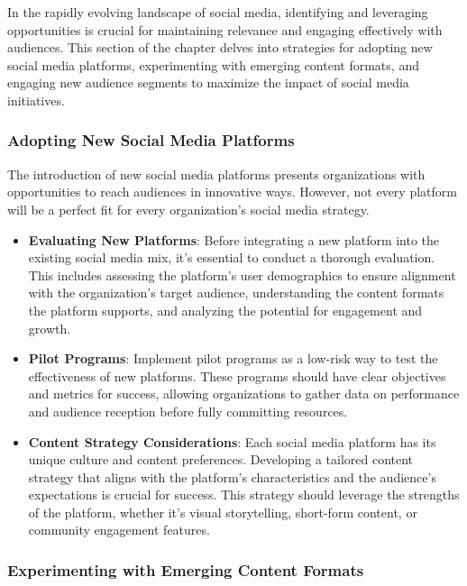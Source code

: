 \documentclass[
]{book}
\providecommand{\tightlist}{%
  \setlength{\itemsep}{0pt}\setlength{\parskip}{0pt}}
\begin{document}
In the rapidly evolving landscape of social media, identifying and leveraging opportunities is crucial for maintaining relevance and engaging effectively with audiences. This section of the chapter delves into strategies for adopting new social media platforms, experimenting with emerging content formats, and engaging new audience segments to maximize the impact of social media initiatives.

\hypertarget{adopting-new-social-media-platforms}{%
\subsubsection*{Adopting New Social Media Platforms}\label{adopting-new-social-media-platforms}}

The introduction of new social media platforms presents organizations with opportunities to reach audiences in innovative ways. However, not every platform will be a perfect fit for every organization's social media strategy.

\begin{itemize}
\tightlist
\item
  \textbf{Evaluating New Platforms}: Before integrating a new platform into the existing social media mix, it's essential to conduct a thorough evaluation. This includes assessing the platform's user demographics to ensure alignment with the organization's target audience, understanding the content formats the platform supports, and analyzing the potential for engagement and growth.
\item
  \textbf{Pilot Programs}: Implement pilot programs as a low-risk way to test the effectiveness of new platforms. These programs should have clear objectives and metrics for success, allowing organizations to gather data on performance and audience reception before fully committing resources.
\item
  \textbf{Content Strategy Considerations}: Each social media platform has its unique culture and content preferences. Developing a tailored content strategy that aligns with the platform's characteristics and the audience's expectations is crucial for success. This strategy should leverage the strengths of the platform, whether it's visual storytelling, short-form content, or community engagement features.
\end{itemize}

\hypertarget{experimenting-with-emerging-content-formats}{%
\subsubsection*{Experimenting with Emerging Content Formats}\label{experimenting-with-emerging-content-formats}}
\end{document}
